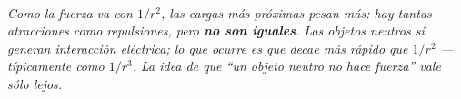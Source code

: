 \begin{center}
\\[0.5em]
{\small\itshape Como la fuerza va con $1/r^2$, las cargas más próximas pesan
más: hay tantas atracciones como repulsiones, pero \textbf{no son iguales}. Los
objetos neutros sí generan interacción eléctrica; lo que ocurre es que decae más
rápido que $1/r^2$ ---típicamente como $1/r^3$. La idea de que ``un objeto
neutro no hace fuerza'' vale sólo lejos.}
\end{center}
